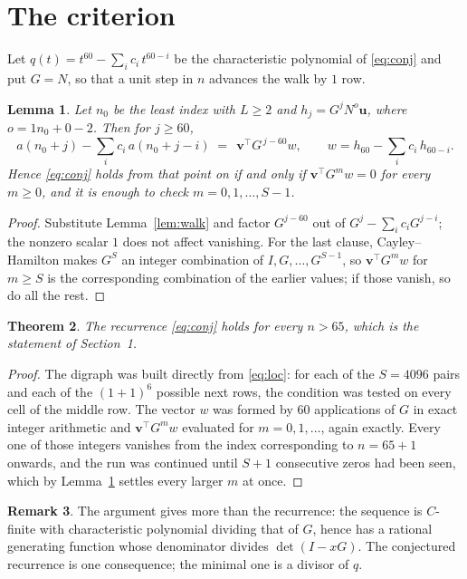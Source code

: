 \documentclass[11pt,a4paper]{article}
\theoremstyle{plain}
\newtheorem{theorem}{Theorem}
\newtheorem{lemma}[theorem]{Lemma}
\theoremstyle{definition}
\newtheorem{remark}[theorem]{Remark}
\begin{document}
\section{The criterion}

Let $q(t)=t^{60}-\sum_i c_i\,t^{60-i}$ be the characteristic polynomial of
\eqref{eq:conj} and put $G=N$, so that a unit step in $n$ advances the walk by
$1$ row.

\begin{lemma}\label{lem:crit}
Let $n_0$ be the least index with $L\ge2$ and $h_j=G^{j}N^{o}\mathbf{u}$, where
$o=1n_0+0-2$. Then for $j\ge60$,
\[
a(n_0+j)-\sum_i c_i\,a(n_0+j-i)\;=\;\,\mathbf{v}^{\!\top}G^{\,j-60}w,
\qquad w=h_{60}-\sum_i c_i\,h_{60-i} .
\]
Hence \eqref{eq:conj} holds from that point on if and only if
$\mathbf{v}^{\!\top}G^{m}w=0$ for every $m\ge0$, and it is enough to check
$m=0,1,\dots,S-1$.
\end{lemma}

\begin{proof}
Substitute Lemma~\ref{lem:walk} and factor $G^{j-60}$ out of
$G^{j}-\sum_ic_iG^{j-i}$; the nonzero scalar $1$ does not affect
vanishing. For the last clause, Cayley--Hamilton makes $G^{S}$ an integer combination of
$I,G,\dots,G^{S-1}$, so $\mathbf{v}^{\!\top}G^{m}w$ for $m\ge S$ is the corresponding
combination of the earlier values; if those vanish, so do all the rest.
\end{proof}

\begin{theorem}
The recurrence \eqref{eq:conj} holds for every $n>65$, which is the statement of
Section~1.
\end{theorem}

\begin{proof}
The digraph was built directly from \eqref{eq:loc}: for each of the $S=4096$ pairs and each
of the $(1+1)^{6}$ possible next rows, the condition was tested on every cell of
the middle row. The vector $w$ was formed by $60$ applications of $G$ in exact integer
arithmetic and $\mathbf{v}^{\!\top}G^{m}w$ evaluated for $m=0,1,\dots$, again exactly.
Every one of those integers vanishes from the index corresponding to $n=65+1$ onwards,
and the run was continued until $S+1$ consecutive zeros had been seen, which by
Lemma~\ref{lem:crit} settles every larger $m$ at once.
\end{proof}

\begin{remark}
The argument gives more than the recurrence: the sequence is $C$-finite with characteristic
polynomial dividing that of $G$, hence has a rational generating function whose denominator
divides $\det(I-xG)$. The conjectured recurrence is one consequence; the minimal one is a
divisor of $q$.
\end{remark}
\end{document}
